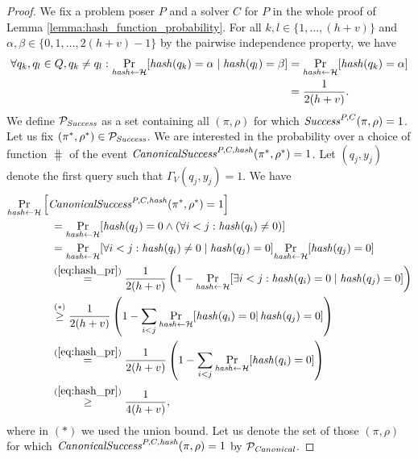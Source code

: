 \begin{proof}
We fix a problem poser $P$ and a solver $C$ for $P$ in the whole proof of Lemma \ref{lemma:hash_function_probability}.
For all $k,l \in \{1, \dotsc, (h+v)\}$ and $\alpha,\beta \in \{0,1,\dotsc,2(h+v)-1\}$ by the pairwise independence property, we have
\begin{align}
  \label{eq:hash_pr}
 \forall q_k,q_l \in Q, q_k \neq q_l : \underset{\operatorname{\mathit{hash}} \leftarrow \mathcal{H}}{\Pr}[\operatorname{\mathit{hash}}(q_k) = \alpha \mid \operatorname{\mathit{hash}}(q_l) = \beta] &=
 \underset{\operatorname{\mathit{hash}} \leftarrow \mathcal{H}}{\Pr}[\operatorname{\mathit{hash}}(q_k) = \alpha] \notag\\
 &= \frac{1}{2(h+v)}.
\end{align}
%
We define $\mathcal{P}_{\operatorname{\mathit{Success}}}$ as a set containing all $(\pi,\rho)$ for which $\operatorname{\mathit{Success}}^{P, C}(\pi, \rho) = 1$.
Let us fix $(\pi^*, \rho^*) \in \mathcal{P}_{\mathit{Success}}$. We are interested in the probability over
a choice of function $\hash$ of the event $\operatorname{\mathit{CanonicalSuccess}}^{P,C,\operatorname{\mathit{hash}}}(\pi^*, \rho^*) = 1$.
Let $(q_j, y_j)$ denote the first query such that $\Gamma_V(q_j, y_j) = 1$. We have
\begin{align}
  \label{ineq:prob_hash_success}
  &\underset{\operatorname{\mathit{hash}} \leftarrow \mathcal{H}}{\Pr}\left[\operatorname{\mathit{CanonicalSuccess}}^{P,C,\operatorname{\mathit{hash}}}(\pi^*, \rho^*) = 1\right] \notag\\
  &\mbox\qquad\qquad = \underset{\operatorname{\mathit{hash}} \leftarrow \mathcal{H}}{\Pr}[\operatorname{\mathit{hash}}(q_j) = 0 \land (\forall i < j : \operatorname{\mathit{hash}}(q_i) \neq 0)] \notag\\
  &\mbox\qquad\qquad = \underset{\operatorname{\mathit{hash}} \leftarrow \mathcal{H}}{\Pr}[
  \forall i < j : \operatorname{\mathit{hash}}(q_i) \neq 0 \mid \operatorname{\mathit{hash}}(q_j) = 0] \underset{\operatorname{\mathit{hash}} \leftarrow \mathcal{H}}{\Pr}[\operatorname{\mathit{hash}}(q_j) = 0] \notag\\
  &\mbox\qquad\qquad \stackrel{(\ref{eq:hash_pr})}{=} \frac{1}{2(h+v)}\left(1 -\underset{\operatorname{\mathit{hash}} \leftarrow \mathcal{H}}{\Pr}[\exists i < j : \operatorname{\mathit{hash}}(q_i) = 0 \mid \operatorname{\mathit{hash}}(q_j) = 0] \right) \notag\\
  &\mbox\qquad\qquad \stackrel{(*)}{\geq} \frac{1}{2(h+v)} \left( 1 - \sum_{i < j} \underset{\operatorname{\mathit{hash}} \leftarrow \mathcal{H}}{\Pr}[\operatorname{\mathit{hash}}(q_i) = 0 | \operatorname{\mathit{hash}}(q_j) = 0] \right) \notag\\
  &\mbox\qquad\qquad \stackrel{(\ref{eq:hash_pr})}{=} \frac{1}{2(h+v)} \left( 1 -  \sum_{i < j}\underset{\operatorname{\mathit{hash}} \leftarrow \mathcal{H}}{\Pr}[\operatorname{\mathit{hash}}(q_i) = 0] \right) \notag\\
  &\mbox\qquad\qquad \stackrel{(\ref{eq:hash_pr})}{\geq} \frac{1}{4(h+v)},
\end{align}
where in $(*)$ we used the union bound.
Let us denote the set of those $(\pi,\rho)$ for which \linebreak
 $\operatorname{\mathit{CanonicalSuccess}}^{P, C, \operatorname{\mathit{hash}}}(\pi, \rho) = 1$ by $\mathcal{P}_{\mathit{Canonical}}$.

\end{proof}
